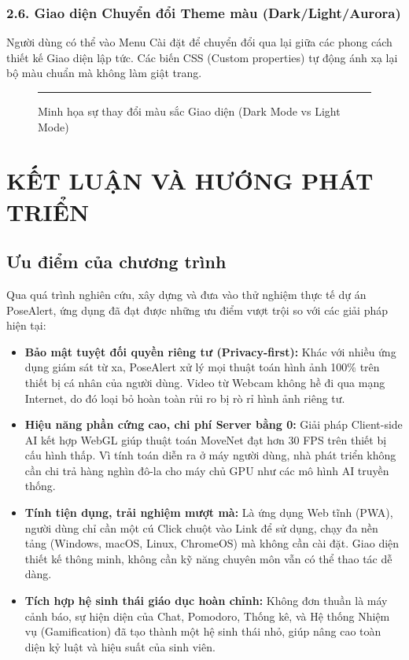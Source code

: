 \documentclass[12pt,a4paper]{report}
\begin{document}
\subsection{2.6. Giao diện Chuyển đổi Theme màu (Dark/Light/Aurora)}
Người dùng có thể vào Menu Cài đặt để chuyển đổi qua lại giữa các phong cách thiết kế Giao diện lập tức. Các biến CSS (Custom properties) tự động ánh xạ lại bộ màu chuẩn mà không làm giật trang.

\begin{figure}[H]
    \centering
    \rule{0.9\textwidth}{8cm} %
    \caption{Minh họa sự thay đổi màu sắc Giao diện (Dark Mode vs Light Mode)}
\end{figure}


\chapter{KẾT LUẬN VÀ HƯỚNG PHÁT TRIỂN}

\section{Ưu điểm của chương trình}
Qua quá trình nghiên cứu, xây dựng và đưa vào thử nghiệm thực tế dự án PoseAlert, ứng dụng đã đạt được những ưu điểm vượt trội so với các giải pháp hiện tại:
\begin{itemize}
    \item \textbf{Bảo mật tuyệt đối quyền riêng tư (Privacy-first):} Khác với nhiều ứng dụng giám sát từ xa, PoseAlert xử lý mọi thuật toán hình ảnh 100\% trên thiết bị cá nhân của người dùng. Video từ Webcam không hề đi qua mạng Internet, do đó loại bỏ hoàn toàn rủi ro bị rò rỉ hình ảnh riêng tư.
    \item \textbf{Hiệu năng phần cứng cao, chi phí Server bằng 0:} Giải pháp Client-side AI kết hợp WebGL giúp thuật toán MoveNet đạt hơn 30 FPS trên thiết bị cấu hình thấp. Vì tính toán diễn ra ở máy người dùng, nhà phát triển không cần chi trả hàng nghìn đô-la cho máy chủ GPU như các mô hình AI truyền thống.
    \item \textbf{Tính tiện dụng, trải nghiệm mượt mà:} Là ứng dụng Web tĩnh (PWA), người dùng chỉ cần một cú Click chuột vào Link để sử dụng, chạy đa nền tảng (Windows, macOS, Linux, ChromeOS) mà không cần cài đặt. Giao diện thiết kế thông minh, không cần kỹ năng chuyên môn vẫn có thể thao tác dễ dàng.
    \item \textbf{Tích hợp hệ sinh thái giáo dục hoàn chỉnh:} Không đơn thuần là máy cảnh báo, sự hiện diện của Chat, Pomodoro, Thống kê, và Hệ thống Nhiệm vụ (Gamification) đã tạo thành một hệ sinh thái nhỏ, giúp nâng cao toàn diện kỷ luật và hiệu suất của sinh viên.
\end{itemize}
\end{document}
